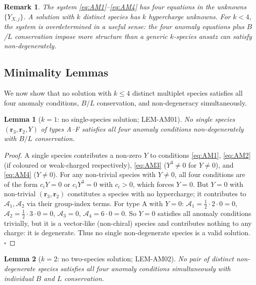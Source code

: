 \documentclass[12pt, a4paper]{article}
\newtheorem{lemma}{Lemma}[section]
\newtheorem{remark}{Remark}[section]
\begin{document}
\begin{remark}
The system \eqref{eq:AM1}--\eqref{eq:AM4} has four equations
in the unknowns $\{Y_{X,j}\}$. A solution with $k$ distinct
species has $k$ hypercharge unknowns. For $k < 4$, the system
is overdetermined in a useful sense: the four anomaly equations
plus $B$/$L$ conservation impose more structure than a generic
$k$-species ansatz can satisfy non-degenerately.
\end{remark}

\subsection{Minimality Lemmas}
\label{sec:lemmas}

We now show that no solution with $k \leq 4$ distinct multiplet
species satisfies all four anomaly conditions, $B/L$ conservation,
and non-degeneracy simultaneously.

\begin{lemma}[$k = 1$: no single-species solution; LEM-AM01]
\label{lem:k1}
No single species $(\mathbf{r}_3, \mathbf{r}_2, Y)$ of types
A--F satisfies all four anomaly conditions non-degenerately with
$B/L$ conservation.
\end{lemma}

\begin{proof}
A single species contributes a non-zero $Y$ to conditions
\eqref{eq:AM1}, \eqref{eq:AM2} (if coloured or weak-charged
respectively), \eqref{eq:AM3} ($Y^3 \neq 0$ for $Y \neq 0$),
and \eqref{eq:AM4} ($Y \neq 0$). For any non-trivial species
with $Y \neq 0$, all four conditions are of the form
$c_i Y = 0$ or $c_i Y^3 = 0$ with $c_i > 0$, which forces
$Y = 0$. But $Y = 0$ with non-trivial $(\mathbf{r}_3, \mathbf{r}_2)$
constitutes a species with no hypercharge; it contributes to
$\mathcal{A}_1, \mathcal{A}_2$ via their group-index terms. For
type A with $Y = 0$: $\mathcal{A}_1 = \frac{1}{2} \cdot 2 \cdot 0 = 0$,
$\mathcal{A}_2 = \frac{1}{2} \cdot 3 \cdot 0 = 0$, $\mathcal{A}_3 = 0$,
$\mathcal{A}_4 = 6 \cdot 0 = 0$. So $Y = 0$ satisfies all anomaly
conditions trivially, but it is a vector-like (non-chiral) species
and contributes nothing to any charge: it is degenerate.
Thus no single non-degenerate species is a valid solution.
\hfill$\square$
\end{proof}

\begin{lemma}[$k = 2$: no two-species solution; LEM-AM02]
\label{lem:k2}
No pair of distinct non-degenerate species satisfies all four
anomaly conditions simultaneously with individual $B$ and $L$
conservation.
\end{lemma}
\end{document}
